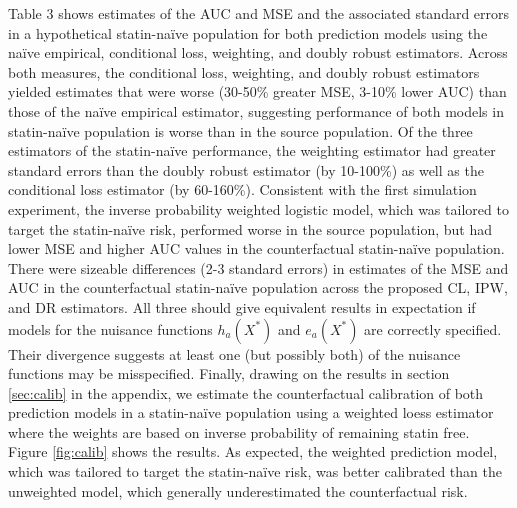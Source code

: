 Table 3 shows estimates of the AUC and MSE and the associated standard errors in a hypothetical statin-na\"{i}ve population for both prediction models using the na\"{i}ve empirical, conditional loss, weighting, and doubly robust estimators. Across both measures, the conditional loss, weighting, and doubly robust estimators yielded estimates that were worse (30-50\% greater MSE, 3-10\% lower AUC) than those of the na\"{i}ve empirical estimator, suggesting performance of both models in statin-na\"{i}ve population is worse than in the source population. Of the three estimators of the statin-na\"{i}ve performance, the weighting estimator had greater standard errors than the doubly robust estimator (by 10-100\%) as well as the conditional loss estimator (by 60-160\%). Consistent with the first simulation experiment, the inverse probability weighted logistic model, which was tailored to target the statin-na\"{i}ve risk, performed worse in the source population, but had lower MSE and higher AUC values in the counterfactual statin-na\"{i}ve population. There were sizeable differences (2-3 standard errors) in estimates of the MSE and AUC in the counterfactual statin-na\"{i}ve population across the proposed CL, IPW, and DR estimators. All three should give equivalent results in expectation if models for the nuisance functions $h_a(X^*)$ and $e_a(X^*)$ are correctly specified. Their divergence suggests at least one (but possibly both) of the nuisance functions may be misspecified. Finally, drawing on the results in section \ref{sec:calib} in the appendix, we estimate the counterfactual calibration of both prediction models in a statin-na\"{i}ve population using a weighted loess estimator where the weights are based on inverse probability of remaining statin free. Figure \ref{fig:calib} shows the results. As expected, the weighted prediction model, which was tailored to target the statin-na\"{i}ve risk, was better calibrated than the unweighted model, which generally underestimated the counterfactual risk.

